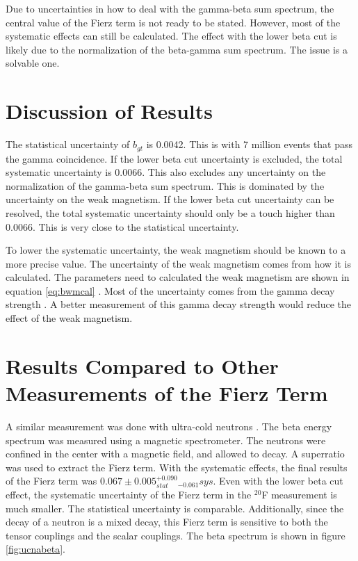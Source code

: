 \documentclass[main.tex]{subfiles}
\begin{document}
Due to uncertainties in how to deal with the gamma-beta sum spectrum, the central value of the Fierz term is not ready to be stated. 
However, most of the systematic effects can still be calculated.
The effect with the lower beta cut is likely due to the normalization of the beta-gamma sum spectrum.
The issue is a solvable one. 

\section{Discussion of Results}

The statistical uncertainty of $b_{gt}$ is 0.0042.
This is with 7 million events that pass the gamma coincidence.
If the lower beta cut uncertainty is excluded, the total systematic uncertainty is 0.0066.
This also excludes any uncertainty on the normalization of the gamma-beta sum spectrum.
This is dominated by the uncertainty on the weak magnetism.
If the lower beta cut uncertainty can be resolved, the total systematic uncertainty should only be a touch higher than 0.0066.
This is very close to the statistical uncertainty. 

To lower the systematic uncertainty, the weak magnetism should be known to a more precise value.
The uncertainty of the weak magnetism comes from how it is calculated.
The parameters need to calculated the weak magnetism are shown in equation \ref{eq:bwmcal} .
Most of the uncertainty comes from the gamma decay strength \cite{Min11}.
A better measurement of this gamma decay strength would reduce the effect of the weak magnetism.

\section{Results Compared to Other Measurements of the Fierz Term}

A similar measurement was done with ultra-cold neutrons \cite{Hic17}.
The beta energy spectrum was measured using a magnetic spectrometer.
The neutrons were confined in the center with a magnetic field, and allowed to decay.
A superratio was used to extract the Fierz term.
With the systematic effects, the final results of the Fierz term was $0.067 \pm 0.005_{stat}  ^{+0.090}_{-0.061} sys$.
Even with the lower beta cut effect, the systematic uncertainty of the Fierz term in the $^{20}$F measurement is much smaller.
The statistical uncertainty is comparable. 
Additionally, since the decay of a neutron is a mixed decay, this Fierz term is sensitive to both the tensor couplings and the scalar couplings.  
The beta spectrum is shown in figure \ref{fig:ucnabeta}.
\end{document}
